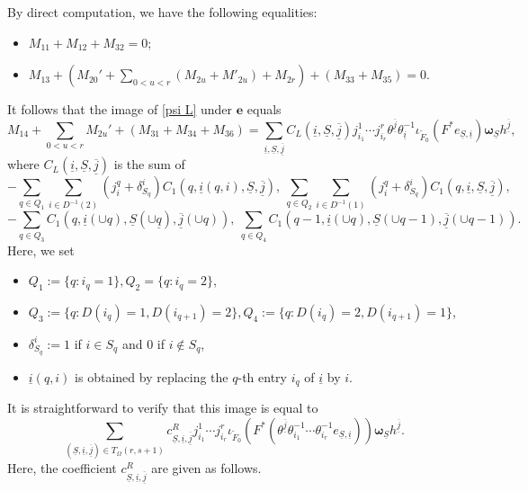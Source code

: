 \documentclass[12pt, a4paper]{article}
\begin{document}
By direct computation, we have the following equalities: 
\begin{itemize}
    \item $M_{11}+M_{12}+M_{32}=0$;
    \item  $M_{13}+(M_{20}'+\sum_{0<u<r}(M_{2u}+M'_{2u})+M_{2r})+(M_{33}+M_{35})=0$.
\end{itemize}
It follows that the image of \eqref{psi L} under $\boldsymbol{e}$ equals
$$
M_{14}+\sum_{0<u<r}M_{2u}'+(M_{31}+M_{34}+M_{36})=\sum_{\underline i,\underline S,\underline{\overline j}}C_L(\underline i,\underline S,\underline{\overline j})j^1_{i_1}\cdots j^r_{i_r}\theta^{\underline{\overline j}}\theta_{\underline i}^{-1}\iota_{\tilde F_0}(F^*e_{\underline S,\underline i})\boldsymbol{\omega}_{\underline S}h^{\underline{\overline j}},
$$
where $C_L(\underline i,\underline S,\underline{\overline j})$ is the sum of 
$$
-\sum_{q\in Q_1}\sum_{i\in D^{-1}(2)}(j^q_i+\delta_{S_q}^i)C_1(q,\underline i(q,i),\underline S,\underline{\overline j}),~
\sum_{q\in Q_2}\sum_{i\in D^{-1}(1)}(j^q_i+\delta_{S_q}^i)C_1(q,\underline i,\underline S,\underline{\overline j}),
$$
$$
-\sum_{q\in Q_3}C_1(q,\underline i(\cup q),\underline S(\cup\underline q),\underline{\overline j}(\cup q)),~\sum_{q\in Q_4}C_1(q-1,\underline i(\cup q),\underline S(\cup q-1),\underline{\overline j}(\cup q-1)).
$$
Here, we set 
\begin{itemize}
    \item $Q_1:=\{q:i_q=1\},Q_2=\{q:i_q=2\}$,
    \item $Q_3:=\{q:D(i_q)=1,D(i_{q+1})=2\}, Q_4:=\{q:D(i_q)=2,D(i_{q+1})=1\}$,
    \item $\delta_{S_q}^i:=1$ if $i\in S_q$ and $0$ if $i\notin S_q$,
    \item $\underline i(q,i)$ is obtained by replacing the $q$-th entry $i_q$ of $\underline i$ by $i$.
\end{itemize}\fi
It is straightforward to verify that this image is equal to
$$
\sum_{(\underline S,\underline i,\underline{\overline j})\in T_\Omega(r,s+1)}c^R_{\underline S,\underline i,\underline{\overline j}}j^1_{i_1}\cdots j^r_{i_r}\iota_{\tilde F_0}(F^* 
(\theta^{\underline{\overline j}}\theta_{i_1}^{-1}\cdots\theta_{i_r}^{-1}
e_{\underline S,\underline i}))\boldsymbol{\omega}_{\underline S}h^{\underline{\overline j}}.
$$
Here, the coefficient $c^R_{\underline S,\underline i,\underline{\overline j}}$ are given as follows.
\end{document}
